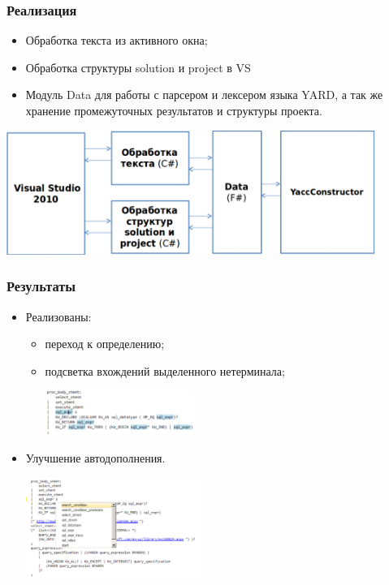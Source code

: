\documentclass{beamer}
\begin{document}
\begin{frame}
	\transwipe[direction=90]
	\frametitle{Реализация}
	\begin{itemize}
        \item Обработка текста из активного окна;
        \item Обработка структуры solution и project в VS
        \item Модуль Data для работы с парсером и лексером языка YARD, а так же хранение промежуточных результатов и структуры проекта.
    \end{itemize}
	\begin{center}
        {\includegraphics[width= 0.9\textwidth, height=0.4\textheight]{diagrams/VSYard1.pdf}}
    \end{center}
\end{frame}

\begin{frame}
	\transwipe[direction=90]
	\frametitle{Результаты}
	\begin{itemize}
        \item Реализованы:
	    \begin{itemize}
            \item переход к определению;
            \item подсветка вхождений выделенного нетерминала;
            
                
            	\begin{center}
                    {\includegraphics[width=0.4\textwidth, height=0.2\textheight]{diagrams/Select.pdf}}
                \end{center}
            
        \end{itemize}
        \item 
        {
            Улучшение автодополнения.
           	\begin{center}
                    {\includegraphics[width= 0.45\textwidth, height=0.35\textheight]{diagrams/Autocomplete.pdf}}
            \end{center}
        }
    \end{itemize}
\end{frame}
    
\end{document}
